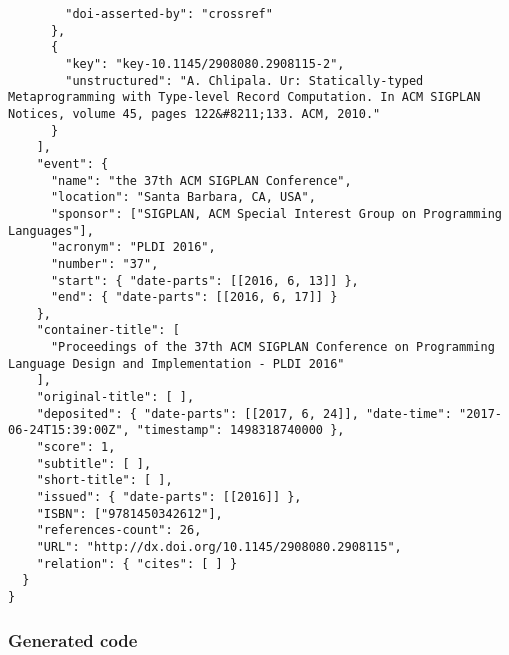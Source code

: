 \begin{multicols}{2}
\begin{verbatim}
        "doi-asserted-by": "crossref"
      },
      {
        "key": "key-10.1145/2908080.2908115-2",
        "unstructured": "A. Chlipala. Ur: Statically-typed Metaprogramming with Type-level Record Computation. In ACM SIGPLAN Notices, volume 45, pages 122&#8211;133. ACM, 2010."
      }
    ],
    "event": {
      "name": "the 37th ACM SIGPLAN Conference",
      "location": "Santa Barbara, CA, USA",
      "sponsor": ["SIGPLAN, ACM Special Interest Group on Programming Languages"],
      "acronym": "PLDI 2016",
      "number": "37",
      "start": { "date-parts": [[2016, 6, 13]] },
      "end": { "date-parts": [[2016, 6, 17]] }
    },
    "container-title": [
      "Proceedings of the 37th ACM SIGPLAN Conference on Programming Language Design and Implementation - PLDI 2016"
    ],
    "original-title": [ ],
    "deposited": { "date-parts": [[2017, 6, 24]], "date-time": "2017-06-24T15:39:00Z", "timestamp": 1498318740000 },
    "score": 1,
    "subtitle": [ ],
    "short-title": [ ],
    "issued": { "date-parts": [[2016]] },
    "ISBN": ["9781450342612"],
    "references-count": 26,
    "URL": "http://dx.doi.org/10.1145/2908080.2908115",
    "relation": { "cites": [ ] }
  }
}
\end{verbatim}
\end{multicols}

\subsubsection{Generated code}

